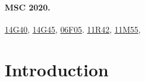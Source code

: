 \documentclass[11pt,a4paper]{article}
\begin{document}
\paragraph{MSC 2020.}  
\href{http://www.ams.org/mathscinet/msc/msc2020.html?t=14G40&btn=Current}{14G40},      %
\href{http://www.ams.org/mathscinet/msc/msc2020.html?t=14G45&btn=Current}{14G45},    %
\href{http://www.ams.org/mathscinet/msc/msc2020.html?t=06F05&btn=Current}{06F05}. %
\href{http://www.ams.org/mathscinet/msc/msc2020.html?t=11R42&btn=Current}{11R42}, %
\href{http://www.ams.org/mathscinet/msc/msc2020.html?t=11M55&btn=Current}{11M55}, %






\section{Introduction}
\end{document}
